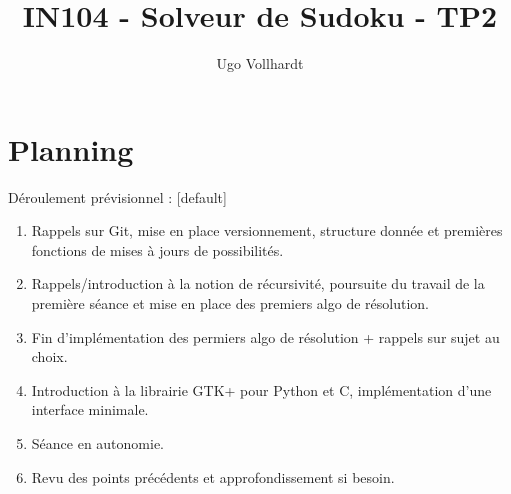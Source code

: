 \documentclass{beamer}
\title{IN104 - Solveur de Sudoku - TP2}
\author{Ugo Vollhardt}
\institute{CEA LIST}
\begin{document}
	\maketitle
	\section{Planning}
	\begin{frame}
	Déroulement prévisionnel : 
	[default]
	\begin{enumerate}
		\item Rappels sur Git, mise en place versionnement, structure donnée et premières fonctions de mises à jours de possibilités.
		\item Rappels/introduction à la notion de récursivité, poursuite du travail de la première séance et mise en place des premiers algo de résolution.
		\item Fin d'implémentation des permiers algo de résolution + rappels sur sujet au choix.
		\item Introduction à la librairie GTK+ pour Python et C, implémentation d'une interface minimale.
		\item Séance en autonomie.
		\item Revu des points précédents et approfondissement si besoin.
	\end{enumerate}
	\end{frame}
\end{document}
